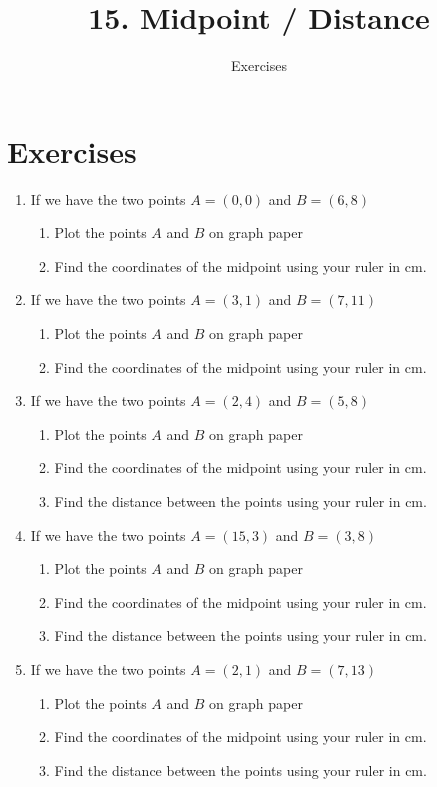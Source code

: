 \documentclass[11pt]{article}
\title{15. Midpoint / Distance}
\author{Exercises}
\begin{document}
\maketitle
\section*{Exercises}
\begin{enumerate}
	\item If we have the two points $A=(0,0)$ and $B=(6, 8)$
	\begin{enumerate}
		\item Plot the points $A$ and $B$ on graph paper
		\item Find the coordinates of the midpoint using your ruler in cm.
	\end{enumerate}
	\item If we have the two points $A=(3,1)$ and $B=(7, 11)$
	\begin{enumerate}
		\item Plot the points $A$ and $B$ on graph paper
		\item Find the coordinates of the midpoint using your ruler in cm.
	\end{enumerate}
	\item If we have the two points $A=(2,4)$ and $B=(5, 8)$
	\begin{enumerate}
		\item Plot the points $A$ and $B$ on graph paper
		\item Find the coordinates of the midpoint using your ruler in cm.
		\item Find the distance between the points using your ruler in cm.
	\end{enumerate}
	\item If we have the two points $A=(15,3)$ and $B=(3, 8)$
	\begin{enumerate}
		\item Plot the points $A$ and $B$ on graph paper
		\item Find the coordinates of the midpoint using your ruler in cm.
		\item Find the distance between the points using your ruler in cm.
	\end{enumerate}
	\item If we have the two points $A=(2,1)$ and $B=(7, 13)$
	\begin{enumerate}
		\item Plot the points $A$ and $B$ on graph paper
		\item Find the coordinates of the midpoint using your ruler in cm.
		\item Find the distance between the points using your ruler in cm.
	\end{enumerate}
\end{enumerate}
\newpage
\end{document}
